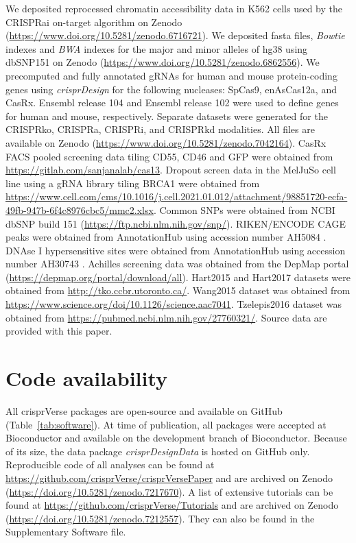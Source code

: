 \documentclass[pdftex,english,10pt]{article}
\begin{document}
{We deposited reprocessed chromatin accessibility data in K562 cells \citep{crispria} used by the CRISPRai on-target algorithm on Zenodo (\url{https://www.doi.org/10.5281/zenodo.6716721}).
We deposited fasta files, \textit{Bowtie} indexes and \textit{BWA} indexes for the major and minor alleles of hg38 using dbSNP151 on Zenodo (\url{https://www.doi.org/10.5281/zenodo.6862556}). We precomputed and fully annotated gRNAs for human and mouse protein-coding genes using \textit{crisprDesign} for the following nucleases: SpCas9, enAsCas12a, and CasRx. Ensembl release 104 and Ensembl release 102 were used to define genes for human and mouse, respectively. Separate datasets were generated for the CRISPRko, CRISPRa, CRISPRi, and CRISPRkd modalities. All files are available on Zenodo (\url{https://www.doi.org/10.5281/zenodo.7042164}).  
CasRx FACS pooled screening data tiling CD55, CD46 and GFP \citep{wessels2020massively} were obtained from \url{https://gitlab.com/sanjanalab/cas13}. 
Dropout screen data in the MelJuSo cell line using a gRNA library tiling BRCA1 \citep{hanna2021massively} were obtained from \url{https://www.cell.com/cms/10.1016/j.cell.2021.01.012/attachment/98851720-ecfa-49fb-947b-6f4c8976cbc5/mmc2.xlsx}. 
Common SNPs were obtained from NCBI dbSNP build 151 (\url{https://ftp.ncbi.nlm.nih.gov/snp/}).
RIKEN/ENCODE CAGE peaks were obtained from AnnotationHub using accession number AH5084 \citep{djebali2012landscape}.
DNAse I hypersensitive sites were obtained from AnnotationHub using accession number AH30743 \citep{kundaje2015integrative}.
Achilles screening data \citep{ceres} was obtained from the DepMap portal (\url{https://depmap.org/portal/download/all}).
Hart2015 \citep{toronto1} and Hart2017 \citep{toronto3} datasets were obtained from \url{http://tko.ccbr.utoronto.ca/}.
Wang2015 dataset \citep{sabatini} was obtained from \url{https://www.science.org/doi/10.1126/science.aac7041}.
Tzelepis2016 dataset \citep{yusa} was obtained from \url{https://pubmed.ncbi.nlm.nih.gov/27760321/}. 
Source data are provided with this paper.








\section*{Code availability}

All crisprVerse packages are open-source and available on GitHub (Table~\ref{tab:software}).
At time of publication, all packages were accepted at Bioconductor and available on the development branch of Bioconductor.
Because of its size, the data package \textit{crisprDesignData} is hosted on GitHub only. 
Reproducible code of all analyses can be found at \url{https://github.com/crisprVerse/crisprVersePaper} and are archived on Zenodo (\url{https://doi.org/10.5281/zenodo.7217670}).
A list of extensive tutorials can be found at \url{https://github.com/crisprVerse/Tutorials} and are archived on Zenodo (\url{https://doi.org/10.5281/zenodo.7212557}).
They can also be found in the Supplementary Software file. 

}
\end{document}
